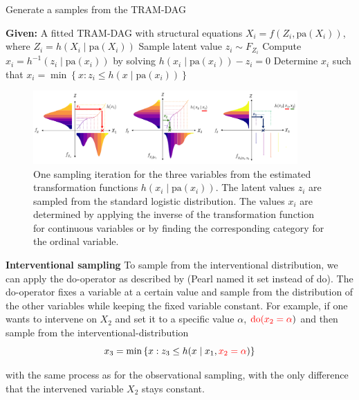 \begin{algorithm}
\caption{Generate a samples from the TRAM-DAG}
\label{alg:sampling}
\begin{algorithmic}[1]
\State \textbf{Given:} A fitted TRAM-DAG with structural equations $X_i = f(Z_i, \text{pa}(X_i))$, where $Z_i = h(X_i \mid \text{pa}(X_i))$
  \State Sample latent value $z_i \sim F_{Z_i}$ 
    \State Compute $x_i = h^{-1}(z_i \mid \text{pa}(x_i))$ by solving $h(x_i \mid \text{pa}(x_i)) - z_i = 0$
    \EndIf
    \State Determine $x_i$ such that $x_i = \min \left\{ x : z_i \le h(x \mid \text{pa}(x_i)) \right\}$
  \EndIf
\EndFor
\end{algorithmic}
\end{algorithm}


\begin{figure}[H]
\centering
\includegraphics[width=0.9\textwidth]{img/sampling.png}
\caption{One sampling iteration for the three variables from the estimated transformation functions $h(x_i \mid \text{pa}(x_i))$. The latent values $z_i$ are sampled from the standard logistic distribution. The values $x_i$ are determined by applying the inverse of the transformation function for continuous variables or by finding the corresponding category for the ordinal variable.}
\label{fig:sampling}
\end{figure}


\textbf{Interventional sampling} To sample from the interventional distribution, we can apply the do-operator as described by \citet{pearl1995} (Pearl named it set instead of do). The do-operator fixes a variable at a certain value and sample from the distribution of the other variables while keeping the fixed variable constant. For example, if one wants to intervene on $X_2$ and set it to a specific value $\alpha$, $\textcolor{red}{\text{do}(x_2 = \alpha})$
and then sample from the interventional-distribution
\[
x_3 = \min \left\{ x : z_3 \le h(x \mid x_1, \textcolor{red}{x_2 = \alpha}) \right\}
\]

with the same process as for the observational sampling, with the only difference that the intervened variable $X_2$ stays constant.





